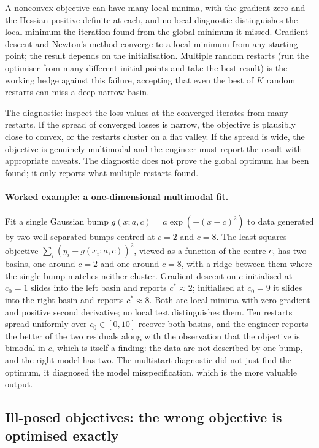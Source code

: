 A nonconvex objective can have many local minima, with the
gradient zero and the Hessian positive definite at each, and no
local diagnostic distinguishes the local minimum the iteration
found from the global minimum it missed. Gradient descent and
Newton's method converge to a local minimum from any starting
point; the result depends on the initialisation. Multiple random
restarts (run the optimiser from many different initial points
and take the best result) is the working hedge against this
failure, accepting that even the best of $K$ random restarts can
miss a deep narrow basin.

The diagnostic: inspect the loss values at the converged
iterates from many restarts. If the spread of converged losses is
narrow, the objective is plausibly close to convex, or the
restarts cluster on a flat valley. If the spread is wide, the
objective is genuinely multimodal and the engineer must report
the result with appropriate caveats. The diagnostic does not
prove the global optimum has been found; it only reports what
multiple restarts found.

\paragraph{Worked example: a one-dimensional multimodal fit.}
Fit a single Gaussian bump $g(x; a, c) = a \exp(-(x - c)^{2})$ to
data generated by two well-separated bumps centred at $c = 2$ and
$c = 8$. The least-squares objective $\sum_{i}(y_{i} - g(x_{i}; a,
c))^{2}$, viewed as a function of the centre $c$, has two basins,
one around $c = 2$ and one around $c = 8$, with a ridge between
them where the single bump matches neither cluster. Gradient
descent on $c$ initialised at $c_{0} = 1$ slides into the left
basin and reports $c^{*} \approx 2$; initialised at $c_{0} = 9$ it
slides into the right basin and reports $c^{*} \approx 8$. Both are
local minima with zero gradient and positive second derivative;
no local test distinguishes them. Ten restarts spread uniformly
over $c_{0} \in [0, 10]$ recover both basins, and the engineer
reports the better of the two residuals along with the observation
that the objective is bimodal in $c$, which is itself a finding:
the data are not described by one bump, and the right model has
two. The multistart diagnostic did not just find the optimum, it
diagnosed the model misspecification, which is the more valuable
output.

\subsection{Ill-posed objectives: the wrong objective is optimised
exactly}

